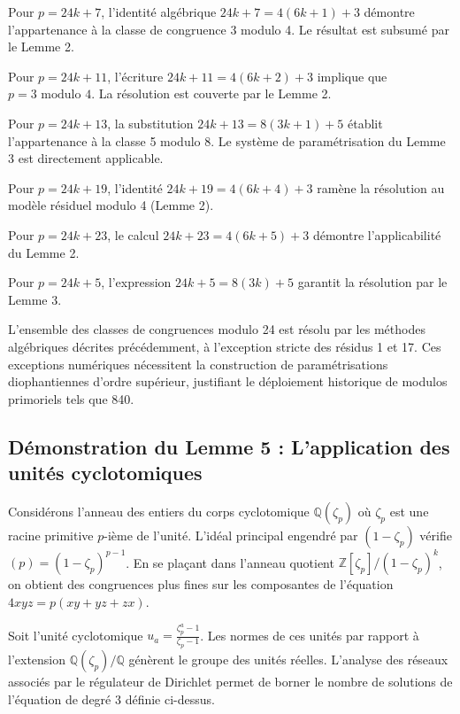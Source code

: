 \documentclass[12pt, a4paper]{article}
\begin{document}
Pour $p = 24k + 7$, l'identit\'e alg\'ebrique $24k + 7 = 4(6k+1) + 3$ d\'emontre l'appartenance \`a la classe de congruence 3 modulo 4. Le r\'esultat est subsum\'e par le Lemme 2.

Pour $p = 24k + 11$, l'\'ecriture $24k + 11 = 4(6k+2) + 3$ implique que $p = 3 \text{ modulo } 4$. La r\'esolution est couverte par le Lemme 2.

Pour $p = 24k + 13$, la substitution $24k + 13 = 8(3k+1) + 5$ \'etablit l'appartenance \`a la classe 5 modulo 8. Le syst\`eme de param\'etrisation du Lemme 3 est directement applicable.

Pour $p = 24k + 19$, l'identit\'e $24k + 19 = 4(6k+4) + 3$ ram\`ene la r\'esolution au mod\`ele r\'esiduel modulo 4 (Lemme 2).

Pour $p = 24k + 23$, le calcul $24k + 23 = 4(6k+5) + 3$ d\'emontre l'applicabilit\'e du Lemme 2.

Pour $p = 24k + 5$, l'expression $24k + 5 = 8(3k) + 5$ garantit la r\'esolution par le Lemme 3.

L'ensemble des classes de congruences modulo 24 est r\'esolu par les m\'ethodes alg\'ebriques d\'ecrites pr\'ec\'edemment, \`a l'exception stricte des r\'esidus 1 et 17. Ces exceptions num\'eriques n\'ecessitent la construction de param\'etrisations diophantiennes d'ordre sup\'erieur, justifiant le d\'eploiement historique de modulos primoriels tels que 840.

\newpage
\subsection{D\'emonstration du Lemme 5 : L'application des unit\'es cyclotomiques}

Consid\'erons l'anneau des entiers du corps cyclotomique $\mathbb{Q}(\zeta_p)$ o\`u $\zeta_p$ est une racine primitive $p$-i\`eme de l'unit\'e.
L'id\'eal principal engendr\'e par $(1-\zeta_p)$ v\'erifie $(p) = (1-\zeta_p)^{p-1}$.
En se pla\c{c}ant dans l'anneau quotient $\mathbb{Z}[\zeta_p]/(1-\zeta_p)^k$, on obtient des congruences plus fines sur les composantes de l'\'equation $4xyz = p(xy+yz+zx)$.

Soit l'unit\'e cyclotomique $u_a = \frac{\zeta_p^a - 1}{\zeta_p - 1}$.
Les normes de ces unit\'es par rapport \`a l'extension $\mathbb{Q}(\zeta_p)/\mathbb{Q}$ g\'en\`erent le groupe des unit\'es r\'eelles. L'analyse des r\'eseaux associ\'es par le r\'egulateur de Dirichlet permet de borner le nombre de solutions de l'\'equation de degr\'e 3 d\'efinie ci-dessus.
\end{document}
